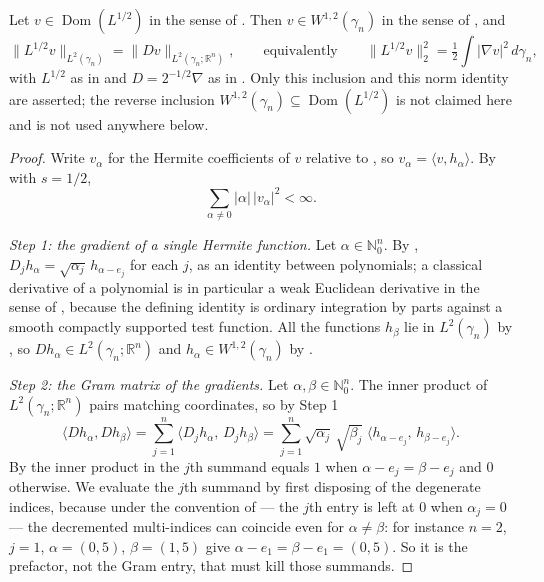\begin{lemma}
Let $v \in \operatorname{Dom}(L^{1/2})$ in the sense of .
Then $v \in W^{1,2}(\gamma_n)$ in the sense of , and
\[
  \|L^{1/2}v\|_{L^2(\gamma_n)} = \|Dv\|_{L^2(\gamma_n;\mathbb{R}^n)},
  \qquad\text{equivalently}\qquad
  \|L^{1/2}v\|_2^2 = \tfrac12\int |\nabla v|^2 \, d\gamma_n ,
\]
with $L^{1/2}$ as in  and $D = 2^{-1/2}\nabla$ as in
.  Only this inclusion and this norm identity are asserted; the
reverse inclusion $W^{1,2}(\gamma_n) \subseteq \operatorname{Dom}(L^{1/2})$ is not
claimed here and is not used anywhere below.
\end{lemma}
\begin{proof}
Write $v_\alpha$ for the Hermite coefficients of $v$ relative to
, so $v_\alpha = \langle v, h_\alpha\rangle$.  By
 with $s = 1/2$,
\begin{equation*}
  \textstyle\sum_{\alpha \neq 0} |\alpha|\,|v_\alpha|^2 < \infty . \tag{1}
\end{equation*}

\emph{Step 1: the gradient of a single Hermite function.}
Let $\alpha \in \mathbb{N}_0^n$.  By ,
$D_j h_\alpha = \sqrt{\alpha_j}\, h_{\alpha - e_j}$ for each $j$, as an identity
between polynomials; a classical derivative of a polynomial is in particular a
weak Euclidean derivative in the sense of , because the
defining identity is ordinary integration by parts against a smooth compactly
supported test function.  All the functions $h_\beta$ lie in $L^2(\gamma_n)$ by
, so $Dh_\alpha \in L^2(\gamma_n;\mathbb{R}^n)$ and
$h_\alpha \in W^{1,2}(\gamma_n)$ by .

\emph{Step 2: the Gram matrix of the gradients.}
Let $\alpha, \beta \in \mathbb{N}_0^n$.  The inner product of
$L^2(\gamma_n;\mathbb{R}^n)$ pairs matching coordinates, so by Step 1
\[
  \langle D h_\alpha, D h_\beta\rangle
    = \sum_{j=1}^n \bigl\langle D_j h_\alpha,\, D_j h_\beta\bigr\rangle
    = \sum_{j=1}^n \sqrt{\alpha_j}\,\sqrt{\beta_j}\;
        \bigl\langle h_{\alpha-e_j},\, h_{\beta-e_j}\bigr\rangle .
\]
By  the inner product in the $j$th summand equals
$1$ when $\alpha - e_j = \beta - e_j$ and $0$ otherwise.  We evaluate the $j$th
summand by first disposing of the degenerate indices, because under the convention
of  --- the $j$th entry is left at $0$ when $\alpha_j = 0$
--- the decremented multi-indices can coincide even for $\alpha \neq \beta$: for
instance $n = 2$, $j = 1$, $\alpha = (0,5)$, $\beta = (1,5)$ give
$\alpha - e_1 = \beta - e_1 = (0,5)$.  So it is the prefactor, not the Gram entry,
that must kill those summands.


\end{proof}
